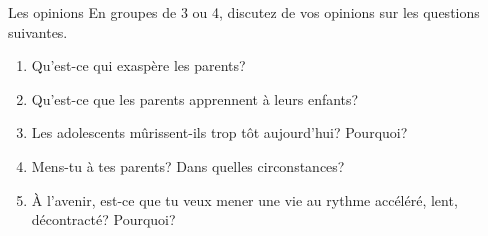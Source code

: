 \begin{frame}{Les opinions}
  En groupes de 3 ou 4, discutez de vos opinions sur les questions suivantes.
  \begin{enumerate}
    \item Qu'est-ce qui exaspère les parents?
    \item Qu'est-ce que les parents apprennent à leurs enfants?
    \item Les adolescents mûrissent-ils trop tôt aujourd'hui? Pourquoi?
    \item Mens-tu à tes parents? Dans quelles circonstances?
    \item À l'avenir, est-ce que tu veux mener une vie au rythme accéléré, lent, décontracté? Pourquoi?
  \end{enumerate}
\end{frame}